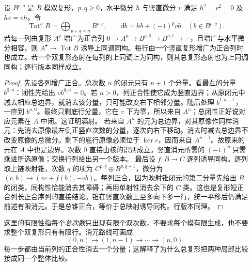 \begin{lemma}\label{g2:lem:first-quadrant-comparison}
	设 \(B^{p,q}\) 是 \(R\) 模双复形，\(p,q\ge0\)，水平微分 \(h\) 与竖直微分 \(v\) 满足 \(h^2=v^2=0\) 及 \(hv=vh\)。令
	\[
		\operatorname{Tot}^nB=\bigoplus_{p+q=n}B^{p,q},\qquad
		\mathrm d b=h b+(-1)^p v b\quad(b\in B^{p,q}).
	\]
	若每一列由复形 \(A^p\) 增广为正合列 \(0\to A^p\to B^{p,0}\to B^{p,1}\to\cdots\)，且增广与水平微分相容，则 \(A^\bullet\to\operatorname{Tot}B\) 诱导上同调同构。每行由一个竖直复形增广为正合列时也成立。若一个双复形态射在每列的上同调上为同构，则其总复形态射也为上同调同构；逐行版本同样成立。
\end{lemma}
\begin{proof}
	先设各列增广正合。总次数 \(n\) 的闭元只有 \(n+1\) 个分量。看最左的分量 \(b^{0,n}\)：闭性先给出 \(vb^{0,n}=0\)。若 \(n>0\)，列正合性使它成为竖直边界；从原闭元中减去相应总边界，就消去该分量，只可能改变右下相邻分量。随后处理 \(b^{1,n-1}\)，一直到 \(b^{n,0}\)。最终只剩底行分量，它在 \(v\) 下为零，所以来自 \(A^n\)；总闭性正好说对应元素在 \(A\) 中闭。这证明满射。
	若来自 \(A^n\) 的元为总边界，对其原像作同样消元：先消去原像最左侧正竖直次数的分量，逐次向右下移动。消去时减去总边界不改变原像的总微分。剩下的底行原像必须位于 \(\ker v\)，因而来自 \(A^{n-1}\)。故原来的元在 \(A\) 中也是边界。次数 \(0\) 直接由核的识别成立。竖直消元所需的 \((-1)^p\) 只需乘进所选原像；交换行列给出另一个版本。
	最后设 \(f:B\to C\) 逐列诱导同构。逐列取上链映射锥，次数 \(q\) 的项为 \(C^{p,q}\oplus B^{p,q+1}\)，微分为 \((c,b)\mapsto(vc+f(b),-vb)\)。每列正合，因为映射锥闭元的第二分量先给出 \(B\) 的闭类，同构性恰能消去其障碍；再用单射性消去余下的 \(C\) 类。这也是复形短正合列长正合序列的直接结论。锥在竖直次数上至多向下多一行，统一平移后仍满足前述有限消元。于是总锥正合，等价于总映射诱导同构。行版本同理。
\end{proof}

这里的有限性指每个\emph{总次数}只出现有限个双次数，不要求每个模有限生成，也不要求整个双复形只有有限行。消元路线可画成
\[
	(0,n)\longrightarrow(1,n-1)\longrightarrow\cdots\longrightarrow(n,0).
\]
每一步都由当前列的正合性消去一个分量；这解释了为什么总复形把两种局部比较接成同一个整体比较。


